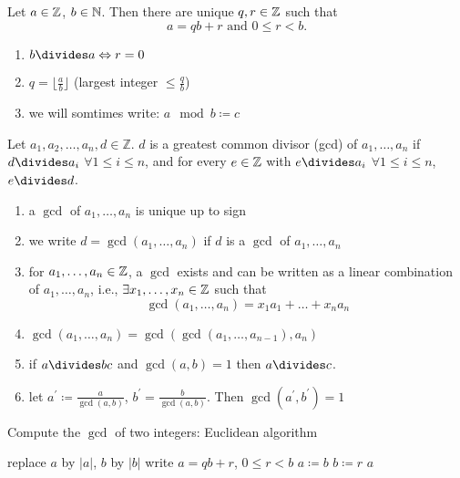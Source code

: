 \documentclass[NumTh.tex]{subfiles}
\begin{document}
\begin{defi}[Remainder]
Let $a \in \mathbb{Z}$, $b \in \mathbb{N}$. Then there are unique $q,r \in \mathbb{Z}$ such that
\[a = qb + r \text{ and } 0 \leq r < b.\]
\end{defi}

\begin{rem}
\begin{enumerate}
  \item $b\divides a \Leftrightarrow r = 0$
  \item $q = \lfloor \frac{a}{b} \rfloor$ (largest integer $\leq \frac{q}{b}$)
  \item we will somtimes write: $a \mod b \coloneq c$
\end{enumerate}
\end{rem}

\begin{defi}
Let $a_1,a_2,\dots,a_n,d \in \mathbb{Z}$. $d$ is a greatest common divisor (gcd) of $a_1,\dots,a_n$ if
$d\divides a_i$ $\forall 1\leq i \leq n$,
and for every $e \in \mathbb{Z}$ with $e\divides a_i$ $\forall 1\leq i \leq n$, $e\divides d$.
\end{defi}

\begin{rem}

\begin{enumerate}
  \item a $\gcd$ of $a_1,\dots,a_n$ is unique up to sign
  \item we write $d = \gcd(a_1,\dots,a_n)$ if $d$ is a $\gcd$ of $a_1,\dots,a_n$
  \item for $a_1,\dots,a_n \in \mathbb{Z}$, a $\gcd$ exists and can be written as a linear combination of $a_1,\dots,a_n$,
  i.e., $\exists x_1,\dots,x_n \in \mathbb{Z}$ such that $$\gcd(a_1,\dots,a_n) = x_1 a_1+ \dots + x_n a_n$$
  \item $\gcd(a_1,\dots,a_n) = \gcd(\gcd(a_1,\dots,a_{n-1}),a_n)$
  \item if $a\divides bc$ and $\gcd(a,b) = 1$ then $a\divides c$.
  \item let $a^\prime \coloneq \frac{a}{\gcd(a,b)}$, $b^\prime = \frac{b}{\gcd(a,b)}$. Then $\gcd(a^\prime,b^\prime) = 1$
\end{enumerate}
\end{rem}

\begin{algorithm}
  \caption{Compute the $\gcd$ of two integers: Euclidean algorithm}
  \begin{algorithmic}
    \State replace $a$ by $|a|$, $b$ by $|b|$
      \State write $a = qb +r$, $0 \leq r < b$
      \State $a \coloneq b$
      \State $b \coloneq r$
    \EndWhile
    \State \Return $a$
  \end{algorithmic}
\end{algorithm}
\end{document}
